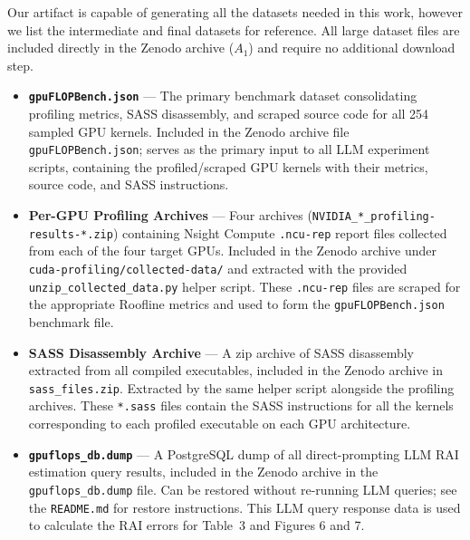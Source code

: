 





Our artifact is capable of generating all the datasets needed in this work, however we list the intermediate and final datasets for reference.
All large dataset files are included directly in the Zenodo archive ($A_1$) and require no additional download step.

\begin{itemize}
    \item \textbf{\texttt{gpuFLOPBench.json}} --- The primary benchmark dataset consolidating profiling metrics, SASS disassembly, and scraped source code for all 254 sampled GPU kernels.
    Included in the Zenodo archive file \texttt{gpuFLOPBench.json}; serves as the primary input to all LLM experiment scripts, containing the profiled/scraped GPU kernels with their metrics, source code, and SASS instructions.

    \item \textbf{Per-GPU Profiling Archives} --- Four archives (\texttt{NVIDIA\_*\_profiling-results-*.zip}) containing Nsight Compute \texttt{.ncu-rep} report files collected from each of the four target GPUs.
    Included in the Zenodo archive under \texttt{cuda-profiling/collected-data/} and extracted with the provided \texttt{unzip\_collected\_data.py} helper script.
    These \texttt{.ncu-rep} files are scraped for the appropriate Roofline metrics and used to form the \texttt{gpuFLOPBench.json} benchmark file.

    \item \textbf{SASS Disassembly Archive} --- A zip archive of SASS disassembly extracted from all compiled executables, included in the Zenodo archive in \texttt{sass\_files.zip}.
    Extracted by the same helper script alongside the profiling archives.
    These \texttt{*.sass} files contain the SASS instructions for all the kernels corresponding to each profiled executable on each GPU architecture.

    \item \textbf{\texttt{gpuflops\_db.dump}} --- A PostgreSQL dump of all direct-prompting LLM RAI estimation query results, included in the Zenodo archive in the \texttt{gpuflops\_db.dump} file.
    Can be restored without re-running LLM queries; see the \texttt{README.md} for restore instructions.
    This LLM query response data is used to calculate the RAI errors for Table~3 and Figures 6 and 7.


\end{itemize}
